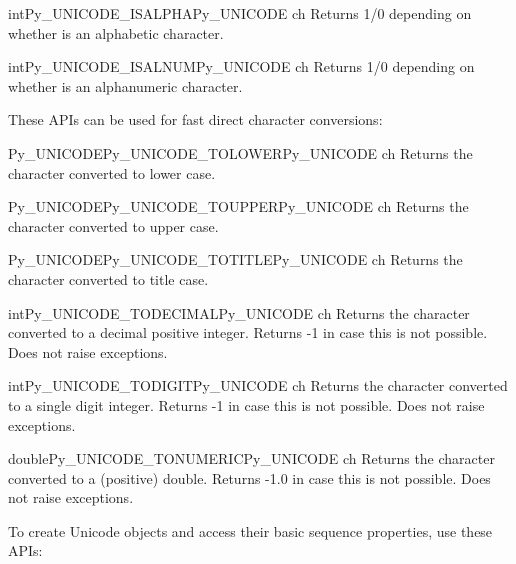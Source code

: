 \documentclass{manual}
\begin{document}
\begin{cfuncdesc}{int}{Py_UNICODE_ISALPHA}{Py_UNICODE ch}
Returns 1/0 depending on whether  is an alphabetic character.
\end{cfuncdesc}

\begin{cfuncdesc}{int}{Py_UNICODE_ISALNUM}{Py_UNICODE ch}
Returns 1/0 depending on whether  is an alphanumeric character.
\end{cfuncdesc}

These APIs can be used for fast direct character conversions:

\begin{cfuncdesc}{Py_UNICODE}{Py_UNICODE_TOLOWER}{Py_UNICODE ch}
Returns the character  converted to lower case.
\end{cfuncdesc}

\begin{cfuncdesc}{Py_UNICODE}{Py_UNICODE_TOUPPER}{Py_UNICODE ch}
Returns the character  converted to upper case.
\end{cfuncdesc}

\begin{cfuncdesc}{Py_UNICODE}{Py_UNICODE_TOTITLE}{Py_UNICODE ch}
Returns the character  converted to title case.
\end{cfuncdesc}

\begin{cfuncdesc}{int}{Py_UNICODE_TODECIMAL}{Py_UNICODE ch}
Returns the character  converted to a decimal positive integer.
Returns -1 in case this is not possible. Does not raise exceptions.
\end{cfuncdesc}

\begin{cfuncdesc}{int}{Py_UNICODE_TODIGIT}{Py_UNICODE ch}
Returns the character  converted to a single digit integer.
Returns -1 in case this is not possible. Does not raise exceptions.
\end{cfuncdesc}

\begin{cfuncdesc}{double}{Py_UNICODE_TONUMERIC}{Py_UNICODE ch}
Returns the character  converted to a (positive) double.
Returns -1.0 in case this is not possible. Does not raise exceptions.
\end{cfuncdesc}


To create Unicode objects and access their basic sequence properties,
use these APIs:
\end{document}
